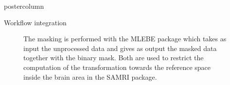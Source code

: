 \begin{frame}
\begin{columns}
\begin{column}{.42\textwidth}
\begin{beamercolorbox}[center]{postercolumn}
\begin{minipage}{.98\textwidth}
{\begin{myblock}{Workflow integration}
                                \vspace{-1.5em}

                                \begin{figure}
                                    \centering
                                    \caption{The masking is performed with the \textcolor{lg}{MLEBE} \cite{mlebe} package which takes as input the unprocessed data and gives as output the masked data together with the binary mask. Both are used to restrict the computation of the transformation towards the reference space inside the brain area in the \textcolor{lg}{SAMRI} \cite{irsabi} package.}
                                \end{figure}
                            \end{myblock}\vfill

}
\end{minipage}
\end{beamercolorbox}
\end{column}
\end{columns}
\end{frame}
